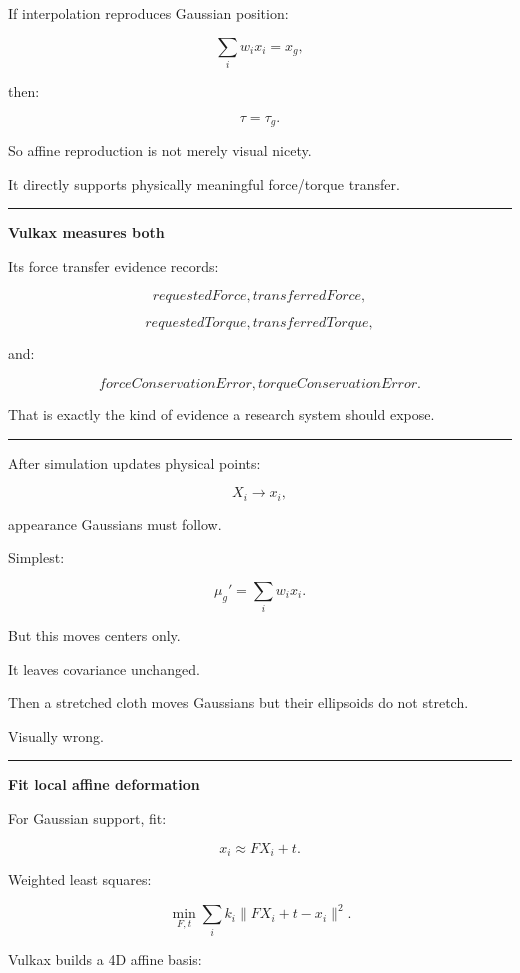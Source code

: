 If interpolation reproduces Gaussian position:

\[
\sum_iw_ix_i=x_g,
\]

then:

\[
\boxed{
\tau=\tau_g.
}
\]

So affine reproduction is not merely visual nicety.

It directly supports physically meaningful force/torque transfer.

\begin{center}\rule{0.5\linewidth}{0.5pt}\end{center}

\textbf{Vulkax measures both}

Its force transfer evidence records:

\[
requestedForce,
transferredForce,
\]

\[
requestedTorque,
transferredTorque,
\]

and:

\[
forceConservationError,
torqueConservationError.
\]

That is exactly the kind of evidence a research system should expose.

\begin{center}\rule{0.5\linewidth}{0.5pt}\end{center}

After simulation updates physical points:

\[
X_i\rightarrow x_i,
\]

appearance Gaussians must follow.

Simplest:

\[
\mu_g'
=
\sum_iw_ix_i.
\]

But this moves centers only.

It leaves covariance unchanged.

Then a stretched cloth moves Gaussians but their ellipsoids do not stretch.

Visually wrong.

\begin{center}\rule{0.5\linewidth}{0.5pt}\end{center}

\textbf{Fit local affine deformation}

For Gaussian support, fit:

\[
x_i
\approx
F X_i+t.
\]

Weighted least squares:

\[
\min_{F,t}
\sum_i
k_i
\|
FX_i+t-x_i
\|^2.
\]

Vulkax builds a 4D affine basis:

